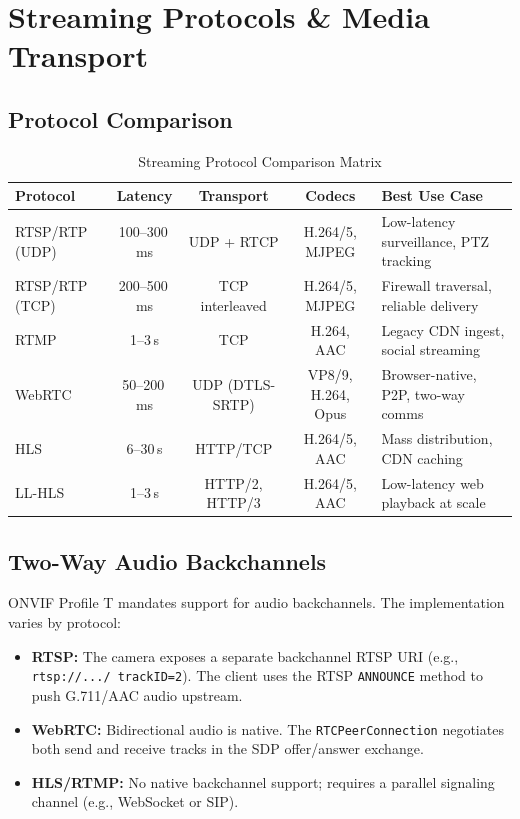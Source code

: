 \documentclass[12pt,a4paper]{article}
\begin{document}
\section{Streaming Protocols \& Media Transport}

\subsection{Protocol Comparison}
\begin{table}[h!]
\centering
\caption{Streaming Protocol Comparison Matrix}
\begin{tabularx}{\textwidth}{l c c c X}
\toprule
\textbf{Protocol} & \textbf{Latency} & \textbf{Transport} & \textbf{Codecs} & \textbf{Best Use Case} \\
\midrule
RTSP/RTP (UDP) & 100--300\,ms & UDP + RTCP & H.264/5, MJPEG & Low-latency surveillance, PTZ tracking \\
RTSP/RTP (TCP) & 200--500\,ms & TCP interleaved & H.264/5, MJPEG & Firewall traversal, reliable delivery \\
RTMP & 1--3\,s & TCP & H.264, AAC & Legacy CDN ingest, social streaming \\
WebRTC & 50--200\,ms & UDP (DTLS-SRTP) & VP8/9, H.264, Opus & Browser-native, P2P, two-way comms \\
HLS & 6--30\,s & HTTP/TCP & H.264/5, AAC & Mass distribution, CDN caching \\
LL-HLS & 1--3\,s & HTTP/2, HTTP/3 & H.264/5, AAC & Low-latency web playback at scale \\
\bottomrule
\end{tabularx}
\end{table}

\subsection{Two-Way Audio Backchannels}
ONVIF Profile T mandates support for audio backchannels. The implementation varies by protocol:
\begin{itemize}
    \item \textbf{RTSP:} The camera exposes a separate backchannel RTSP URI (e.g., \texttt{rtsp://.../ trackID=2}). The client uses the RTSP \texttt{ANNOUNCE} method to push G.711/AAC audio upstream.
    \item \textbf{WebRTC:} Bidirectional audio is native. The \texttt{RTCPeerConnection} negotiates both send and receive tracks in the SDP offer/answer exchange.
    \item \textbf{HLS/RTMP:} No native backchannel support; requires a parallel signaling channel (e.g., WebSocket or SIP).
\end{itemize}
\end{document}
